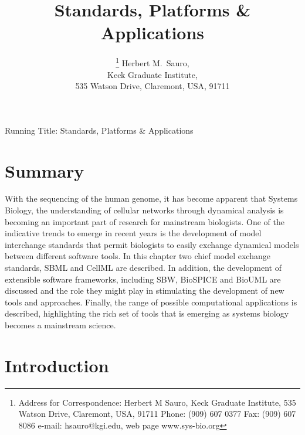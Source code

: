 \documentclass[12pt]{article}
\begin{document}
\thispagestyle{empty}

\onecolumn

\title{Standards, Platforms \& Applications}

\author{\thanks{Address for Correspondence: Herbert
M Sauro, Keck Graduate Institute, 535 Watson Drive, Claremont,
USA, 91711 Phone: (909) 607 0377  Fax: (909) 607 8086 e-mail:
hsauro@kgi.edu, web page www.sys-bio.org} Herbert M.\ Sauro, \\
Keck Graduate Institute, \\ 535 Watson Drive, Claremont, USA,
91711 \\ }

\maketitle
\vspace{3in} Running Title: Standards, Platforms \& Applications
 \clearpage

\pagebreak

\section*{Summary}

With the sequencing of the human genome, it has become apparent that Systems Biology, the understanding of cellular networks through dynamical analysis is becoming an important
part of research for mainstream biologists. One of the indicative trends to emerge in recent years is the development of model interchange standards that permit biologists to easily exchange dynamical models between different software tools. In this chapter
two chief model exchange standards, SBML and CellML are described. In addition,
the development of extensible software frameworks, including SBW, BioSPICE and
BioUML are discussed and the role they might play in stimulating the development
of new tools and approaches. Finally, the range of possible computational applications is
described, highlighting the rich set of tools that is emerging as systems biology
becomes a mainstream science.

\pagebreak

\section{Introduction}
\end{document}
